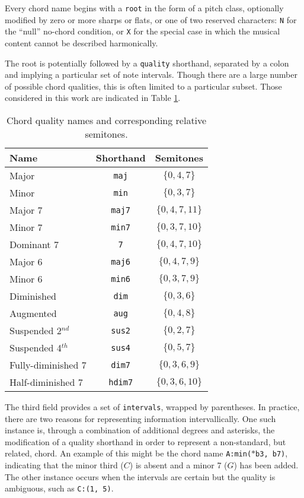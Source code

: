 \noindent Every chord name begins with a \texttt{root} in the form of a pitch class, optionally modified by zero or more sharps or flats, or one of two reserved characters: \texttt{N} for the ``null'' no-chord condition, or \texttt{X} for the special case in which the musical content cannot be described harmonically.

The root is potentially followed by a \texttt{quality} shorthand, separated by a colon and implying a particular set of note intervals.
Though there are a large number of possible chord qualities, this is often limited to a particular subset.
Those considered in this work are indicated in Table \ref{tab:qualities}.

\begin{table}[t]
\begin{center}
\caption{Chord quality names and corresponding relative semitones.}
\label{tab:qualities}
\begin{tabular}{l | c | c}
Name & Shorthand & Semitones \\
\hline
Major & \texttt{maj} & $\{0, 4, 7\}$ \\
Minor & \texttt{min} & $\{0, 3, 7\}$ \\
Major 7 & \texttt{maj7} & $\{0, 4, 7, 11\}$ \\
Minor 7 & \texttt{min7} & $\{0, 3, 7, 10\}$ \\
Dominant 7 & \texttt{7} & $\{0, 4, 7, 10\}$ \\
Major 6 & \texttt{maj6} & $\{0, 4, 7, 9\}$ \\
Minor 6 & \texttt{min6} & $\{0, 3, 7, 9\}$ \\
Diminished & \texttt{dim} & $\{0, 3, 6\}$ \\
Augmented & \texttt{aug} & $\{0, 4, 8\}$ \\
Suspended 2$^{nd}$ & \texttt{sus2} & $\{0, 2, 7\}$ \\
Suspended 4$^{th}$ & \texttt{sus4} & $\{0, 5, 7\}$ \\
Fully-diminished 7 & \texttt{dim7} & $\{0, 3, 6, 9\}$ \\
Half-diminished 7 & \texttt{hdim7} & $\{0, 3, 6, 10\}$ \\
\hline
\end{tabular}
\end{center}
\end{table}


The third field provides a set of \texttt{intervals}, wrapped by parentheses.
In practice, there are two reasons for representing information intervallically.
One such instance is, through a combination of additional degrees and asterisks, the modification of a quality shorthand in order to represent a non-standard, but related, chord.
An example of this might be the chord name \texttt{A:min($\ast$b3, b7)}, indicating that the minor third ($C$) is absent and a minor 7 ($G$) has been added.
The other instance occurs when the intervals are certain but the quality is ambiguous, such as \texttt{C:(1, 5)}. %

